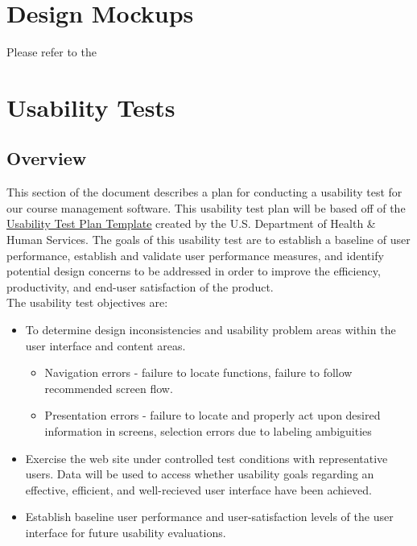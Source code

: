 \documentclass[10pt]{article}
\begin{document}
\begin{multicols}{2}
\section*{Design Mockups}
Please refer to the 

\section*{Usability Tests}
\subsection*{Overview}
This section of the document describes a plan for conducting a usability test for our course management software. This usability test plan will be based off of the \href{http://www.usability.gov/how-to-and-tools/resources/templates/usability-test-plan-template.html}{\underline{Usability Test Plan Template}} created by the U.S. Department of Health \& Human Services. The goals of this usability test are to establish a baseline of user performance, establish and validate user performance measures, and identify potential design concerns to be addressed in order to improve the efficiency, productivity, and end-user satisfaction of the product.\\

The usability test objectives are:
\begin{itemize}
\item To determine design inconsistencies and usability problem areas within the user interface and content areas. 

	\begin{itemize}
	\item Navigation errors - failure to locate functions, failure to follow recommended screen flow.
	\item Presentation errors - failure to locate and properly act upon desired information in screens, selection errors due to 				labeling ambiguities
	\end{itemize}
	
\item Exercise the web site under controlled test conditions with representative users. Data will be used to access whether usability goals regarding an effective, efficient, and well-recieved user interface have been achieved.

\item Establish baseline user performance and user-satisfaction levels of the user interface for future usability evaluations.
\end{itemize}


\end{multicols}
\end{document}
